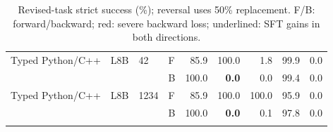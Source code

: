 \begin{table}[t]
\begin{tabular}{lll lrrrrr}
\addlinespace[2pt]
Typed Python/C++ & L8B & 42 & F & 85.9 & 100.0 & 1.8 & 99.9 & 0.0 \\
 &  &  & B & 100.0 & \textcolor{red!70!black}{\textbf{0.0}} & 0.0 & 99.4 & 0.0 \\
\addlinespace[2pt]
Typed Python/C++ & L8B & 1234 & F & 85.9 & 100.0 & 100.0 & 95.9 & 0.0 \\
 &  &  & B & 100.0 & \textcolor{red!70!black}{\textbf{0.0}} & 0.1 & 97.8 & 0.0 \\
\addlinespace[2pt]
\bottomrule
\end{tabular}
\caption{Revised-task strict success (\%); reversal uses 50\% replacement. F/B: forward/backward; red: severe backward loss; underlined: SFT gains in both directions.}
\label{tab:revised-domain-results}
\end{table}
